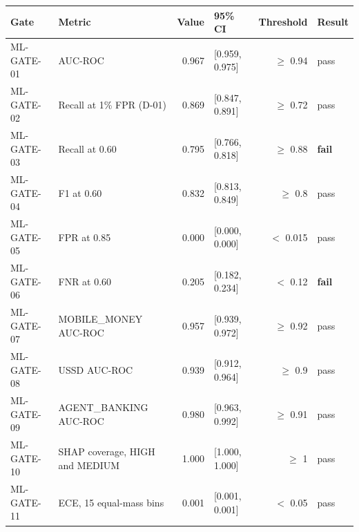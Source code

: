 \begin{tabular}{llrlrl}
\toprule
Gate & Metric & Value & 95\% CI & Threshold & Result \\
\midrule
ML-GATE-01 & AUC-ROC & 0.967 & [0.959, 0.975] & $\geq$ 0.94 & pass \\
ML-GATE-02 & Recall at 1\% FPR (D-01) & 0.869 & [0.847, 0.891] & $\geq$ 0.72 & pass \\
ML-GATE-03 & Recall at 0.60 & 0.795 & [0.766, 0.818] & $\geq$ 0.88 & \textbf{fail} \\
ML-GATE-04 & F1 at 0.60 & 0.832 & [0.813, 0.849] & $\geq$ 0.8 & pass \\
ML-GATE-05 & FPR at 0.85 & 0.000 & [0.000, 0.000] & $<$ 0.015 & pass \\
ML-GATE-06 & FNR at 0.60 & 0.205 & [0.182, 0.234] & $<$ 0.12 & \textbf{fail} \\
ML-GATE-07 & MOBILE_MONEY AUC-ROC & 0.957 & [0.939, 0.972] & $\geq$ 0.92 & pass \\
ML-GATE-08 & USSD AUC-ROC & 0.939 & [0.912, 0.964] & $\geq$ 0.9 & pass \\
ML-GATE-09 & AGENT_BANKING AUC-ROC & 0.980 & [0.963, 0.992] & $\geq$ 0.91 & pass \\
ML-GATE-10 & SHAP coverage, HIGH and MEDIUM & 1.000 & [1.000, 1.000] & $\geq$ 1 & pass \\
ML-GATE-11 & ECE, 15 equal-mass bins & 0.001 & [0.001, 0.001] & $<$ 0.05 & pass \\
\bottomrule
\end{tabular}
